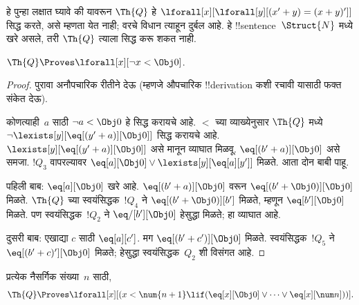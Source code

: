 \documentclass[../../../include/open-logic-section]{subfiles}
\begin{document}
हे पुन्हा लक्षात घ्यावे की यावरून $\Th{Q}$ हे
$\lforall[x][\lforall[y][(x' + y) = (x + y)']]$ सिद्ध करते,
असे म्हणता येत नाही; वरचे विधान त्याहून दुर्बल आहे. हे
!!{sentence}~$\Struct{N}$ मध्ये खरे असले, तरी $\Th{Q}$
त्याला सिद्ध करू शकत नाही.

\begin{lem}
$\Th{Q} \Proves \lforall[x][\lnot x < \Obj 0]$.
\end{lem}

\begin{proof}
पुरावा अनौपचारिक रीतीने देऊ (म्हणजे औपचारिक !!{derivation}
कशी रचावी यासाठी फक्त संकेत देऊ).

कोणत्याही~$a$ साठी $\lnot a < \Obj 0$ हे सिद्ध करायचे आहे.
$<$ च्या व्याख्येनुसार $\Th{Q}$ मध्ये
$\lnot \lexists[y][\eq[(y'+a)][\Obj 0]]$ सिद्ध करायचे आहे.
$\lexists[y][\eq[(y'+a)][\Obj 0]]$ असे मानून व्याघात मिळवू.
$\eq[(b'+a)][\Obj 0]$ असे समजा. $!Q_3$ वापरल्यावर
$\eq[a][\Obj 0] \lor \lexists[y][\eq[a][y']]$ मिळते.
आता दोन बाबी पाहू.

पहिली बाब: $\eq[a][\Obj 0]$ खरे आहे. $\eq[(b'+a)][\Obj 0]$
वरून $\eq[(b' + \Obj 0)][\Obj 0]$ मिळते. $\Th{Q}$ च्या
स्वयंसिद्धक~$!Q_4$ ने $\eq[(b' + \Obj 0)][b']$ मिळते,
म्हणून $\eq[b'][\Obj 0]$ मिळते. पण स्वयंसिद्धक~$!Q_2$ ने
$\eq/[b'][\Obj 0]$ हेसुद्धा मिळते; हा व्याघात आहे.

दुसरी बाब: एखाद्या $c$ साठी $\eq[a][c']$. मग
$\eq[(b' +
c')][\Obj 0]$ मिळते. स्वयंसिद्धक~$!Q_5$ ने
$\eq[(b' + c)'][\Obj 0]$ मिळते; हेसुद्धा स्वयंसिद्धक~$Q_2$
शी विसंगत आहे.
\end{proof}

\begin{lem}
प्रत्येक नैसर्गिक संख्या~$n$ साठी,
  \[
  \Th{Q} \Proves
  \lforall[x][(x < \num {n+1} \lif (\eq[x][\Obj 0] \lor \dots \lor
    \eq[x][\num n]))].
  \]
\end{lem}
\end{document}
